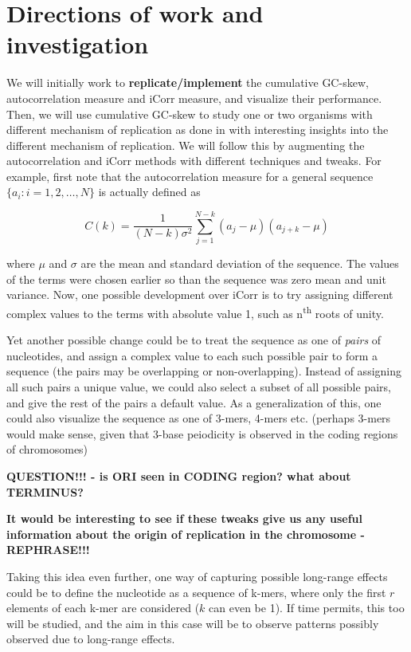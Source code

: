 \documentclass[10pt]{article}
\begin{document}
\section{Directions of work and investigation}

We will initially work to \textbf{replicate/implement} the cumulative GC-skew, autocorrelation measure and iCorr measure, and visualize their performance. Then, we will use cumulative GC-skew to study one or two organisms with different mechanism of replication as done in \cite{cumskew} with interesting insights into the different mechanism of replication. We will follow this by augmenting the autocorrelation and iCorr methods with different techniques and tweaks. For example, first note that the autocorrelation measure for a general sequence $\{a_i:i = 1,2,\hdots,N\}$ is actually defined as

\begin{equation}
C(k) = \frac{1}{(N-k)\sigma^2}\sum_{j=1}^{N-k} (a_j - \mu)(a_{j+k} - \mu)
\end{equation}

where $\mu$ and $\sigma$ are the mean and standard deviation of the sequence. The values of the terms were chosen earlier so than the sequence was zero mean and unit variance. Now, one possible development over iCorr is to try assigning different complex values to the terms with absolute value 1, such as n\textsuperscript{th} roots of unity.

Yet another possible change could be to treat the sequence as one of \textit{pairs} of nucleotides, and assign a complex value to each such possible pair to form a sequence (the pairs may be overlapping or non-overlapping). Instead of assigning all such pairs a unique value, we could also select a subset of all possible pairs, and give the rest of the pairs a default value. As a generalization of this, one could also visualize the sequence as one of 3-mers, 4-mers etc. (perhaps 3-mers would make sense, given that 3-base peiodicity is observed in the coding regions of chromosomes) 

\textbf{QUESTION!!! - is ORI seen in CODING region? what about TERMINUS?}

\textbf{It would be interesting to see if these tweaks give us any useful information about the origin of replication in the chromosome - REPHRASE!!!}

Taking this idea even further, one way of capturing possible long-range effects could be to define the nucleotide as a sequence of k-mers, where only the first $r$ elements of each k-mer are considered ($k$ can even be 1). If time permits, this too will be studied, and the aim in this case will be to observe patterns possibly observed due to long-range effects.
\end{document}

